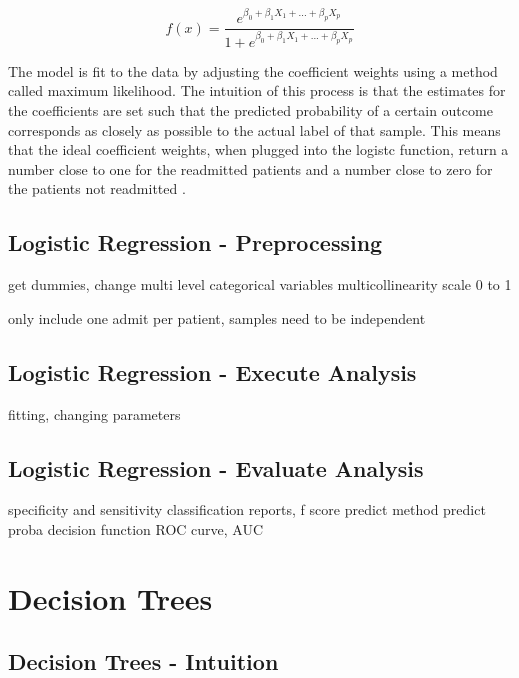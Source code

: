 \documentclass[sigconf]{acmart}
\begin{document}
\[ f(x) =\frac{e^{\beta_0 + \beta_1X_1 + ... + \beta_pX_p}}{1 + e^{\beta_0 + \beta_1X_1 + ... + \beta_pX_p}}  \]

The model is fit to the data by adjusting the coefficient weights using a method called maximum likelihood. The intuition of this process is that the estimates for the coefficients are set such that the predicted probability of a certain outcome corresponds as closely as possible to the actual label of that sample. This means that the ideal coefficient weights, when plugged into the logistc function, return a number close to one for the readmitted patients and a number close to zero for the patients not readmitted \cite{cite08}.

\subsection{Logistic Regression - Preprocessing}


get dummies, change multi level categorical variables
multicollinearity
scale 0 to 1

only include one admit per patient, samples need to be independent

\subsection{Logistic Regression - Execute Analysis}
fitting, changing parameters

\subsection{Logistic Regression - Evaluate Analysis}

specificity and sensitivity
classification reports, f score
predict method
predict proba
decision function
ROC curve, AUC

\section{Decision Trees}

\subsection{Decision Trees - Intuition}
\end{document}
